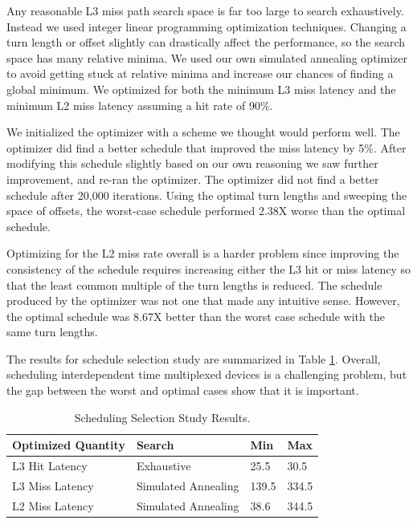 Any reasonable L3 miss path search space is far too large to search 
exhaustively. Instead we used integer linear programming optimization 
techniques. Changing a turn length or offset slightly can drastically affect 
the performance, so the search space has many relative minima. We used 
our own simulated annealing optimizer to avoid getting stuck at relative minima 
and increase our chances of finding a global minimum. We optimized for both the 
minimum L3 miss latency and the minimum L2 miss latency assuming a hit rate of 
90\%. 

We initialized the optimizer with a scheme we thought would perform well. The 
optimizer did find a better schedule that improved the miss latency by 5\%. 
After modifying this schedule slightly based on our own reasoning we saw 
further improvement, and re-ran the optimizer. The optimizer did not find a 
better schedule after 20,000 iterations. Using the optimal turn lengths and 
sweeping the space of offsets, the worst-case schedule performed 2.38X worse 
than the optimal schedule.

Optimizing for the L2 miss rate overall is a harder problem since improving the 
consistency of the schedule requires increasing either the L3 hit or miss 
latency so that the least common multiple of the turn lengths is reduced. The 
schedule produced by the optimizer was not one that made any intuitive sense. 
However, the optimal schedule was 8.67X better than the worst case schedule 
with the same turn lengths.

The results for schedule selection study are summarized in Table 
\ref{tab:coord_results}. Overall, scheduling 
interdependent time multiplexed devices is a challenging problem, but the gap 
between the worst and optimal cases show that it is important.

\begin{table}
    \caption{Scheduling Selection Study Results.}
    \centering
    \begin{tabular}{|l|l|l|l|}
        \hline
        \multicolumn{1}{|l|}{Optimized Quantity} & Search & Min & Max \\\hline
        \multicolumn{1}{|l|}{L3 Hit Latency} & Exhaustive & 25.5 & 30.5 \\\hline
        \multicolumn{1}{|l|}{L3 Miss Latency} & Simulated Annealing& 139.5 & 334.5 \\\hline
        \multicolumn{1}{|l|}{L2 Miss Latency} & Simulated Annealing& 38.6 & 344.5 \\\hline
    \end{tabular}
    \label{tab:coord_results}
\end{table}

